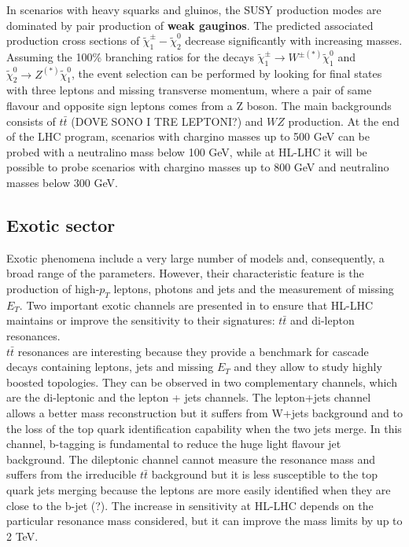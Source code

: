 \documentclass[a4paper,twoside,12pt]{article}
\begin{document}
In scenarios with heavy squarks and gluinos, the SUSY production modes are dominated by 
pair production of \textbf{weak gauginos}. The predicted associated production cross sections of $\widetilde{\chi}_1^\pm - \widetilde{\chi}_2^0$  decrease significantly
with increasing masses. Assuming the 100\% branching ratios for the decays
$\widetilde{\chi}_1^\pm \rightarrow W^{\pm(*)} \widetilde{\chi}_1^0$ and 
$\widetilde{\chi}_2^0 \rightarrow Z^{(*)}\widetilde{\chi}_1^0$, the event selection can be
performed by looking for final states with three leptons and missing transverse momentum,
where a pair of same flavour and opposite sign leptons comes from a Z boson. The main
backgrounds consists of $t\bar{t}$ (DOVE SONO I TRE LEPTONI?) and $WZ$ production.
At the end of the LHC program, scenarios with chargino masses up to 500 GeV can be probed
with a neutralino mass below 100 GeV, while at HL-LHC it will be possible to probe scenarios
with chargino masses up to 800 GeV and neutralino masses below 300 GeV.

\subsection{Exotic sector}
Exotic phenomena include a very large number of models and, consequently, a broad
range of the parameters. However, their characteristic feature is the production of high-$p_T$ 
leptons, photons and jets and the measurement of missing $E_T$. Two important exotic
channels are presented in \cite{loi} to ensure that HL-LHC maintains or improve the
sensitivity to their signatures: $t\bar{t}$ and di-lepton resonances.\\

$t\bar{t}$ resonances are interesting because they provide a benchmark for cascade
decays containing leptons, jets and missing $E_T$ and they allow to study highly boosted
topologies. They can be observed in two complementary channels, which are the di-leptonic and the lepton + jets channels.  The lepton+jets channel allows a better mass reconstruction but it suffers
from W+jets background and to the loss of the top quark identification capability when the two jets merge. In this channel, b-tagging is fundamental to reduce the huge light flavour jet
background. The dileptonic channel cannot measure the resonance mass and suffers from the irreducible $t\bar{t}$ background but
it is less susceptible to the top quark jets merging because the leptons are more easily 
identified when they are close to the b-jet (?).  The increase in sensitivity at HL-LHC depends
on the particular resonance mass considered, but it can improve the mass limits by up to
2 TeV.\\
\end{document}
